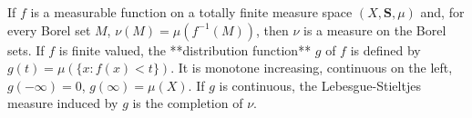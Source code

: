 If $f$ is a measurable function on a totally finite measure space $(X,\mathbf{S},\mu)$ and, for every Borel set $M$, $\nu(M) = \mu(f^{-1}(M))$, then $\nu$ is a measure on the Borel sets. If $f$ is finite valued, the **distribution function** $g$ of $f$ is defined by $g(t) = \mu(\{x : f(x) < t\})$. It is monotone increasing, continuous on the left, $g(-\infty) = 0$, $g(\infty) = \mu(X)$. If $g$ is continuous, the Lebesgue-Stieltjes measure induced by $g$ is the completion of $\nu$.
